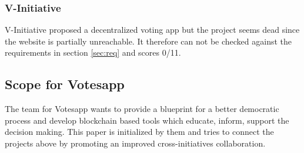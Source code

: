 \subsubsection{V-Initiative}
V-Initiative proposed a decentralized voting app but the project seems dead since the website is partially unreachable. It therefore can not be checked against the requirements in section \ref{sec:req} and scores 0/11.

\subsection{Scope for Votesapp}
The team for Votesapp wants to provide a blueprint for a better democratic process and develop blockchain based tools which educate, inform, support the decision making. This paper is initialized by them and tries to connect the projects above by promoting an improved cross-initiatives collaboration.
